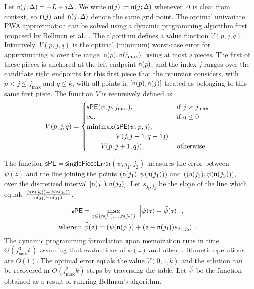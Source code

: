 Let $\mathsf{n}(j; \Delta) = -L + j \Delta$. We write $\mathsf{n}(j) := \mathsf{n}(j; \Delta)$ whenever $\Delta$ is clear from context, so $\mathsf{n}(j)$ and $\mathsf{n}(j; \Delta)$ denote the same grid point.
The optimal univariate PWA approximation can be solved using a dynamic programming algorithm first proposed by Bellman et al.~\cite{Bellman/1961/Approximation,Bellman+Roth/1969/Curve}. The algorithm defines a value function $V(p, j, q)$. Intuitively, $V(p, j, q)$ is the optimal (minimum) worst-case error for approximating $\psi$ over the range $[\mathsf{n}(p), \mathsf{n}(j_{\max})]$ using at most $q$ pieces. The first of these pieces is anchored at the left endpoint $\mathsf{n}(p)$, and the index $j$ ranges over the candidate right endpoints for this first piece that the recursion considers, with $p < j \leq j_{\max}$ and $q \leq k$, with all points in $[\mathsf{n}(p), \mathsf{n}(j)]$ treated as belonging to this same first piece. The function $V$ is recursively defined as
\begin{equation}\label{eq:value-function}
	V(p, j, q) = \begin{cases}
	\mathsf{sPE}(\psi, p, j_{\max}), &\text{if } j \geq j_{\max}\\
		\infty, & \text{if }  q \leq 0                                    \\
        \min(\max(\mathsf{sPE}(\psi, p, j),\\\hspace{4.2em}V(j, j+1, q-1)),\\\hspace{2em}V(p, j+1, q)),&\text{otherwise}
	\end{cases}
\end{equation}

The function $\mathsf{sPE} = \mathsf{singlePieceError}(\psi, j_1, j_2)$ measures the error between $\psi(z)$ and the line joining the points $(\mathsf{n}(j_1), \psi(\mathsf{n}(j_1)))$ and $((\mathsf{n}(j_2), \psi(\mathsf{n}(j_2)))$, over the discretized interval $[\mathsf{n}(j_1), \mathsf{n}(j_2)]$. Let $s_{j_1, j_2}$ be the slope of the line which equals $\frac{ \psi(\mathsf{n}(j_2)) - \psi(\mathsf{n}(j_1))}{\mathsf{n}(j_2) - \mathsf{n}(j_1)}$.
\begin{multline*}
    \mathsf{sPE} =  \max_{z \in \{ \mathsf{n}(j_1),  \ldots, \mathsf{n}(j_2)\}} \ \left| \psi(z) - \widehat{\psi}(z)\right| \,,\\ 
     \text{wherein} \ \widehat{\psi}(z) = \left( \psi(\mathsf{n}(j_1)) + (z - \mathsf{n}(j_1)) s_{j_1, j_2} \right) \,.
\end{multline*}
The dynamic programming formulation upon memoization runs in time $O(j_{\max}^3 k)$ assuming that evaluations of $\psi(z)$ and other arithmetic operations are $O(1)$. The optimal error equals the value $V(0, 1, k)$ and the solution can be recovered in $O(j_{\max}^2 k)$ steps by traversing the table.
Let $\widehat{\psi}$ be the function obtained as a result of running Bellman's algorithm. 

